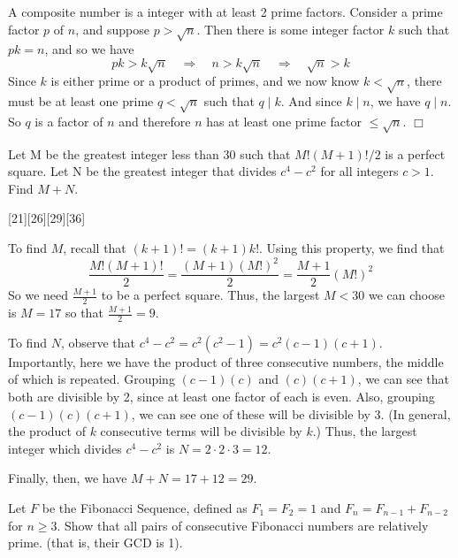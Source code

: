 \begin{solution}
    A composite number is a integer with at least 2 prime factors. Consider a prime factor \(p\) of \(n\), and suppose \(p>\sqrt{n}\). Then there is some integer factor \(k\) such that \(pk=n\), and so we have
    \[
        pk > k\sqrt{n} \quad \Rightarrow \quad n>k\sqrt{n} \quad \Rightarrow \quad \sqrt{n}>k
    \]
    Since \(k\) is either prime or a product of primes, and we now know \(k<\sqrt{n}\), there must be at least one prime \(q<\sqrt{n}\) such that \(q \mid k\). And since \(k \mid n\), we have \(q \mid n\). So \(q\) is a factor of \(n\) and therefore \(n\) has at least one prime factor \(\leq \sqrt{n}\). $\Box$
\end{solution}

\begin{problem}
    Let M be the greatest integer less than 30 such that \(M!(M+1)!/2\) is a perfect square. Let N be the greatest integer that divides \(c^4 - c^2\) for all integers \(c > 1\). Find \(M + N\).
\end{problem}
[21][26][29][36]

\begin{solution}[D]
    To find \(M\), recall that \((k+1)!=(k+1)k!\). Using this property, we find that
    \[
        \frac{M!(M+1)!}{2} = \frac{(M+1)(M!)^2}{2} = \frac{M+1}{2}(M!)^2
    \]
    So we need \(\frac{M+1}{2}\) to be a perfect square. Thus, the largest \(M<30\) we can choose is \(M=17\) so that \(\frac{M+1}{2} = 9\).

    To find \(N\), observe that \(c^4-c^2 = c^2(c^2-1) = c^2(c-1)(c+1)\). Importantly, here we have the product of three consecutive numbers, the middle of which is repeated. Grouping \((c-1)(c)\) and \((c)(c+1)\), we can see that both are divisible by 2, since at least one factor of each is even. Also, grouping \((c-1)(c)(c+1)\), we can see one of these will be divisible by 3. (In general, the product of \(k\) consecutive terms will be divisible by \(k\).) Thus, the largest integer which divides \(c^4-c^2\) is \(N=2\cdot2\cdot3=12\).

    Finally, then, we have \(M+N = 17+12=\boxed{29}\).
    \end{solution}

\begin{problem}[D][2][Folklore]
    Let $F$ be the Fibonacci Sequence, defined as $F_1=F_2 = 1$ and $F_n = F_{n-1} + F_{n-2}$ for $n \geq 3$. Show that all pairs of consecutive Fibonacci numbers are relatively prime. (that is, their GCD is 1).
\end{problem}

